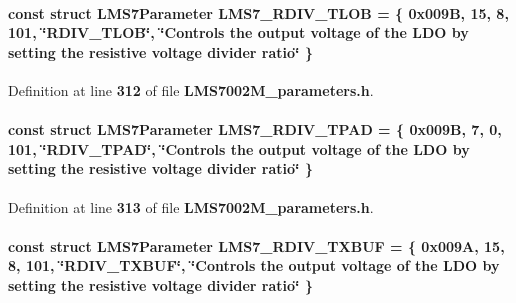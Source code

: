 \paragraph[{L\+M\+S7\+\_\+\+R\+D\+I\+V\+\_\+\+T\+L\+OB}]{\setlength{\rightskip}{0pt plus 5cm}const struct {\bf L\+M\+S7\+Parameter} L\+M\+S7\+\_\+\+R\+D\+I\+V\+\_\+\+T\+L\+OB = \{ 0x009\+B, 15, 8, 101, \char`\"{}\+R\+D\+I\+V\+\_\+\+T\+L\+O\+B\char`\"{}, \char`\"{}\+Controls the output voltage of the L\+D\+O by setting the resistive voltage divider ratio\char`\"{} \}\hspace{0.3cm}{\ttfamily [static]}}\label{LMS7002M__parameters_8h_a7bea0982c48c0cf4507a8c21d4c4b6a1}


Definition at line {\bf 312} of file {\bf L\+M\+S7002\+M\+\_\+parameters.\+h}.

\paragraph[{L\+M\+S7\+\_\+\+R\+D\+I\+V\+\_\+\+T\+P\+AD}]{\setlength{\rightskip}{0pt plus 5cm}const struct {\bf L\+M\+S7\+Parameter} L\+M\+S7\+\_\+\+R\+D\+I\+V\+\_\+\+T\+P\+AD = \{ 0x009\+B, 7, 0, 101, \char`\"{}\+R\+D\+I\+V\+\_\+\+T\+P\+A\+D\char`\"{}, \char`\"{}\+Controls the output voltage of the L\+D\+O by setting the resistive voltage divider ratio\char`\"{} \}\hspace{0.3cm}{\ttfamily [static]}}\label{LMS7002M__parameters_8h_a15e3543c27f0c806d8b705347dbf40f6}


Definition at line {\bf 313} of file {\bf L\+M\+S7002\+M\+\_\+parameters.\+h}.

\paragraph[{L\+M\+S7\+\_\+\+R\+D\+I\+V\+\_\+\+T\+X\+B\+UF}]{\setlength{\rightskip}{0pt plus 5cm}const struct {\bf L\+M\+S7\+Parameter} L\+M\+S7\+\_\+\+R\+D\+I\+V\+\_\+\+T\+X\+B\+UF = \{ 0x009\+A, 15, 8, 101, \char`\"{}\+R\+D\+I\+V\+\_\+\+T\+X\+B\+U\+F\char`\"{}, \char`\"{}\+Controls the output voltage of the L\+D\+O by setting the resistive voltage divider ratio\char`\"{} \}\hspace{0.3cm}{\ttfamily [static]}}\label{LMS7002M__parameters_8h_a22e415c773574cb4613ee605710a9efb}


